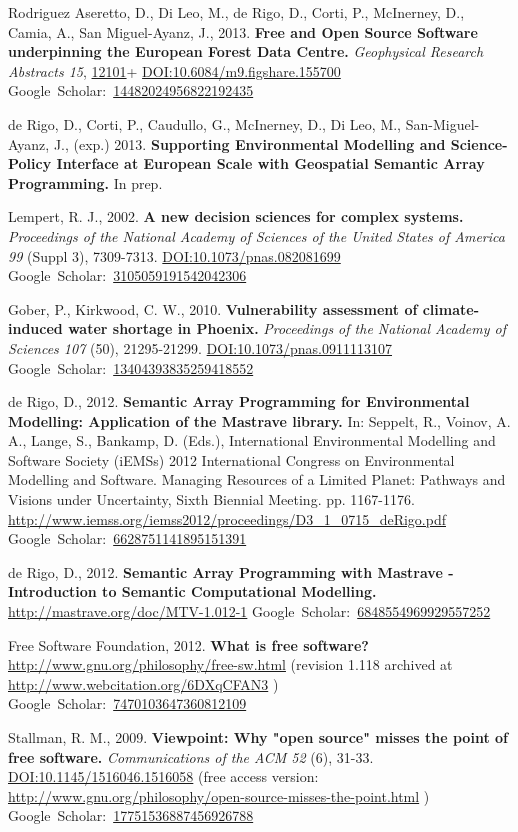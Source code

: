 \documentclass[a4paper,11pt]{article}
\newcommand{\gourl}[1]{\url{#1}}
\newcommand{\goDOI}[1]{\href{http://dx.doi.org/#1}{DOI:#1}}
\newcommand{\goScholar}[1]{{Google~Scholar}:~\href{http://scholar.google.com/scholar?cluster=#1}{#1}}
\begin{document}
\begin{footnotesize}
{\begin{thebibliography}{}
 Rodriguez Aseretto, D., Di Leo, M., de Rigo, D., Corti, P., McInerney, D., Camia, A., San Miguel-Ayanz, J., 2013. \textbf{Free and Open Source Software underpinning the European Forest Data Centre.} \emph{Geophysical Research Abstracts 15}, \href{http://meetingorganizer.copernicus.org/EGU2013/EGU2013-12101.pdf}{12101}+ \goDOI{10.6084/m9.figshare.155700} \goScholar{14482024956822192435}

 de Rigo, D., Corti, P., Caudullo, G., McInerney, D., Di Leo, M., San-Miguel-Ayanz, J., (exp.) 2013. \textbf{Supporting Environmental Modelling and Science-Policy Interface at European Scale with Geospatial Semantic Array Programming.} In prep.

 Lempert, R. J., 2002. \textbf{A new decision sciences for complex systems.} \emph{Proceedings of the National Academy of Sciences of the United States of America 99} (Suppl 3), 7309-7313. \goDOI{10.1073/pnas.082081699} \goScholar{3105059191542042306}


 Gober, P., Kirkwood, C. W., 2010. \textbf{Vulnerability assessment of climate-induced water shortage in Phoenix.} \emph{Proceedings of the National Academy of Sciences 107} (50), 21295-21299. \goDOI{10.1073/pnas.0911113107} \goScholar{13404393835259418552}

 de Rigo, D., 2012. \textbf{Semantic Array Programming for Environmental Modelling: Application of the Mastrave library.} In: Seppelt, R., Voinov, A. A., Lange, S., Bankamp, D. (Eds.), International Environmental Modelling and Software Society (iEMSs) 2012 International Congress on Environmental Modelling and Software. Managing Resources of a Limited Planet: Pathways and Visions under Uncertainty, Sixth Biennial Meeting. pp. 1167-1176. \gourl {http://www.iemss.org/iemss2012/proceedings/D3\_1\_0715\_deRigo.pdf} \goScholar{6628751141895151391}

 de Rigo, D., 2012. \textbf{Semantic Array Programming with Mastrave - Introduction to Semantic Computational Modelling.} \gourl {http://mastrave.org/doc/MTV-1.012-1} \goScholar{6848554969929557252}

 Free Software Foundation, 2012. \textbf{What is free software?} \gourl {http://www.gnu.org/philosophy/free-sw.html} (revision 1.118 archived at \gourl {http://www.webcitation.org/6DXqCFAN3} ) \goScholar{7470103647360812109}

 Stallman, R. M., 2009. \textbf{Viewpoint: Why "open source" misses the point of free software.} \emph{Communications of the ACM 52} (6), 31-33. \goDOI{10.1145/1516046.1516058} (free access version: \gourl {http://www.gnu.org/philosophy/open-source-misses-the-point.html} ) \goScholar{17751536887456926788}


\end{thebibliography}}
\end{footnotesize}
\end{document}
